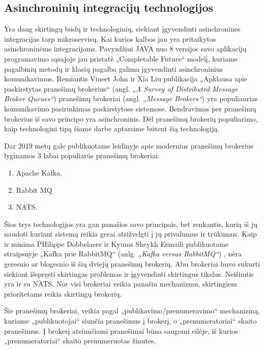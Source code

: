 \subsection{Asinchroninių integracijų technologijos}
Yra daug skirtingų būdų ir technologinių, siekiant įgyvendinti asinchronines integracijas tarp mikroservisų.
Kai kurios kalbos jau yra pritaikytos asinchroninėms integracijoms. Pavyzdžiui JAVA nuo 8 versijos savo aplikacijų programavimo sąsajoje
jau pristatė „Completable Future“ modelį, kuriame pagalbinių metodų ir klasių  pagalba galima įgyvendinti asinchroninius komunikavimus.
Remiantis Vineet John ir Xia Liu publikacija „Apklausa apie paskirstytas pranešimų brokerius“ (angl. \textit{„A Survey of Distributed Message Broker Queues“}) \cite{Sur1}
pranešimų brokeriai (angl. \textit{„Message Brokers“}) yra populiaurias komunikavimo pasirinkimas paskirstytose sistemose. Bendravimas per pranešimų brokerius
iš savo principo yra asinchroninis. Dėl pranešimų brokerių populiarimo, kaip technologini tipą šiame darbe aptarsime būtent šią technologiją.

Dar 2019 metų gale publikuotame leidinyje apie modernius pranešimų brokerius \cite{Misc8} lyginamos 3 labai populiarūs 
pranešimų brokeriai:

\begin{enumerate}
  \item Apache Kafka.
  \item Rabbit MQ
  \item NATS.
\end{enumerate}

Šios trys technologijos yra gan panašios savo principais, bet renkantis, kurią iš jų naudoti kuriant sistemą reikia
gerai atsižvelgti į jų privalumus ir trūkumus. Kaip ir minima PHilippe Dobbelaere ir Kyums Sheykh Esmaili publikuotame straipsnyje „Kafka prie RabbitMQ“
(anlg. \textit{„Kafka versus RabbitMQ“}) \cite{Misc4}, nėra geresnio ar blogesnio iš šių dviejų pranešimų brokerių. Abu brokeriai buvo sukurti siekiant 
išspręsti skirtingas problemas ir įgyvendinti skirtingus tikslus. Neišimtis yra ir su NATS. Nor visi brokeriai veikia panašiu mechanizmu, skirtingiem prioritetams 
reikia skirtingų brokerių.

Šie pranešimų brokeriai, veikia pagal „publikavimo/prenumeravimo“ mechanizmą, kuriame „publikuotojai“ siunčia pranešimus
į brokerį, o „prenumeratoriai“ skaito pranešimus. Į brokerį atsiunčiami pranešimai būna saugomi eilėje, iš kurios 
„prenumeratoriai“ skaito prenumeruotas žinutes.





